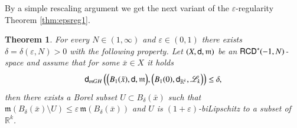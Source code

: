 \documentclass[11pt,reqno]{amsart}
\newcommand{\mm}{\mathfrak m}
\newcommand{\sfd}{{\sf d}}
\newcommand{\LL}{\mathscr{L}}
\newcommand{\R}{\mathbb{R}}
\newcommand{\RCD}{{\sf RCD}}
\newcommand{\vare}{\varepsilon}
\newtheorem{theorem}{Theorem}[section]
\theoremstyle{definition}
\theoremstyle{remark}
\theoremstyle{remark}
\theoremstyle{remark}
\theoremstyle{remark}
\theoremstyle{remark}
\theoremstyle{remark}
\theoremstyle{remark}
\begin{document}
 By a simple rescaling argument we get the next variant of the $\vare$-regularity Theorem \ref{thm:epsreg1}.
\begin{theorem}\label{thm:epsreg2}
For every  $N\in (1,\infty)$ and $\varepsilon\in (0,1)$ there exists $\delta=\delta(\varepsilon, N)>0$ with the following property. Let $(X,\sfd,\mm)$ be an $\RCD^{*}(-1, N)$-space and assume that  for some $\bar{x} \in X$ it holds
 $$\sfd_{mGH} \left( \Big(B_1(\bar{x}) , \sfd, \mm \Big), \Big(B_1(0),\sfd_{\R^k},\LL_k\Big)  \right)  \leq \delta,  $$
 then there exists a Borel subset $U\subset B_{\delta}(\bar{x})$ such that  $\mm(B_{\delta}(\bar{x})\setminus U)\leq \varepsilon \, \mm(B_{\delta}(\bar{x}))$ and $U$ is $(1+\varepsilon)$-biLipschitz to a subset of $\R^{k}$. 
\end{theorem}
\end{document}
